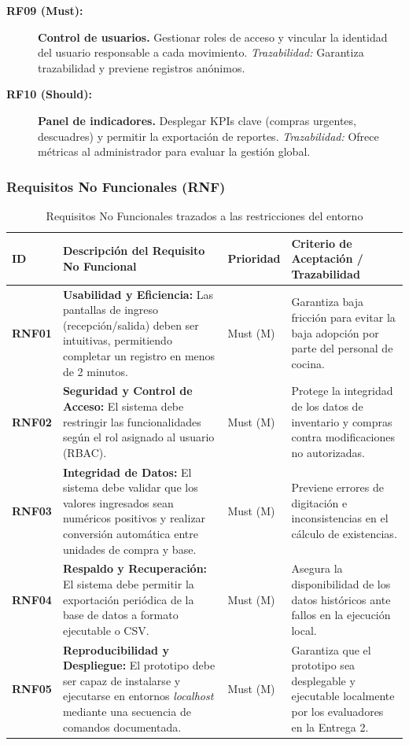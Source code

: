 \documentclass[11pt,letterpaper]{article}
\begin{document}
\begin{description}
    \item[\textbf{RF09 (Must):}] \textbf{Control de usuarios.} Gestionar roles de acceso y vincular la identidad del usuario responsable a cada movimiento. \textit{Trazabilidad:} Garantiza trazabilidad y previene registros anónimos.
    
    \item[\textbf{RF10 (Should):}] \textbf{Panel de indicadores.} Desplegar KPIs clave (compras urgentes, descuadres) y permitir la exportación de reportes. \textit{Trazabilidad:} Ofrece métricas al administrador para evaluar la gestión global.
\end{description}

\subsubsection{Requisitos No Funcionales (RNF)}

\begin{table}[H]
\centering
\caption{Requisitos No Funcionales trazados a las restricciones del entorno}
\label{tab:rnf}
\begin{tabularx}{\textwidth}{p{}Xp{}p{}}
\toprule
\textbf{ID} & \textbf{Descripción del Requisito No Funcional} & \textbf{Prioridad} & \textbf{Criterio de Aceptación / Trazabilidad} \\
\midrule
\textbf{RNF01} & \textbf{Usabilidad y Eficiencia:} Las pantallas de ingreso (recepción/salida) deben ser intuitivas, permitiendo completar un registro en menos de 2 minutos. & Must (M) & Garantiza baja fricción para evitar la baja adopción por parte del personal de cocina. \\
\midrule
\textbf{RNF02} & \textbf{Seguridad y Control de Acceso:} El sistema debe restringir las funcionalidades según el rol asignado al usuario (RBAC). & Must (M) & Protege la integridad de los datos de inventario y compras contra modificaciones no autorizadas. \\
\midrule
\textbf{RNF03} & \textbf{Integridad de Datos:} El sistema debe validar que los valores ingresados sean numéricos positivos y realizar conversión automática entre unidades de compra y base. & Must (M) & Previene errores de digitación e inconsistencias en el cálculo de existencias. \\
\midrule
\textbf{RNF04} & \textbf{Respaldo y Recuperación:} El sistema debe permitir la exportación periódica de la base de datos a formato ejecutable o CSV. & Must (M) & Asegura la disponibilidad de los datos históricos ante fallos en la ejecución local. \\
\midrule
\textbf{RNF05} & \textbf{Reproducibilidad y Despliegue:} El prototipo debe ser capaz de instalarse y ejecutarse en entornos \textit{localhost} mediante una secuencia de comandos documentada. & Must (M) & Garantiza que el prototipo sea desplegable y ejecutable localmente por los evaluadores en la Entrega 2. \\
\bottomrule
\end{tabularx}
\end{table}
\end{document}
